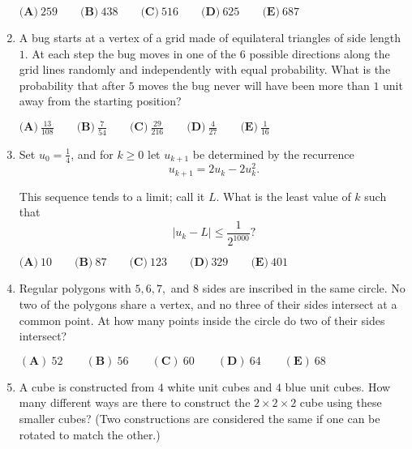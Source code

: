 \documentclass{article}
\begin{document}
\begin{enumerate}[label=\arabic*., itemsep=0.5em]
$\textbf{(A)}\: 259\qquad\textbf{(B)} \: 438\qquad\textbf{(C)} \: 516\qquad\textbf{(D)} \: 625\qquad\textbf{(E)} \: 687$\par \vspace{0.5em}\item A bug starts at a vertex of a grid made of equilateral triangles of side length $1$. At each step the bug moves in one of the $6$ possible directions along the grid lines randomly and independently with equal probability. What is the probability that after $5$ moves the bug never will have been more than $1$ unit away from the starting position?

$\textbf{(A)}\ \frac{13}{108} \qquad\textbf{(B)}\  \frac{7}{54} \qquad\textbf{(C)}\  \frac{29}{216} \qquad\textbf{(D)}\
\frac{4}{27} \qquad\textbf{(E)}\ \frac{1}{16}$\par \vspace{0.5em}\item Set $u_0 = \frac{1}{4}$, and for $k \ge 0$ let $u_{k+1}$ be determined by the recurrence 
\begin{equation*}
u_{k+1} = 2u_k - 2u_k^2.
\end{equation*}


This sequence tends to a limit; call it $L$. What is the least value of $k$ such that 
\begin{equation*}
|u_k-L| \le \frac{1}{2^{1000}}?
\end{equation*}


$\textbf{(A)}\: 10\qquad\textbf{(B)}\: 87\qquad\textbf{(C)}\: 123\qquad\textbf{(D)}\: 329\qquad\textbf{(E)}\: 401$\par \vspace{0.5em}\item Regular polygons with $5,6,7,$ and $8$ sides are inscribed in the same circle. No two of the polygons share a vertex, and no three of their sides intersect at a common point. At how many points inside the circle do two of their sides intersect?

$(\textbf{A})\: 52\qquad(\textbf{B}) \: 56\qquad(\textbf{C}) \: 60\qquad(\textbf{D}) \: 64\qquad(\textbf{E}) \: 68$\par \vspace{0.5em}\item A cube is constructed from $4$ white unit cubes and $4$ blue unit cubes. How many different ways are there to construct the $2 \times 2 \times 2$ cube using these smaller cubes? (Two constructions are considered the same if one can be rotated to match the other.)


\end{enumerate}
\end{document}
